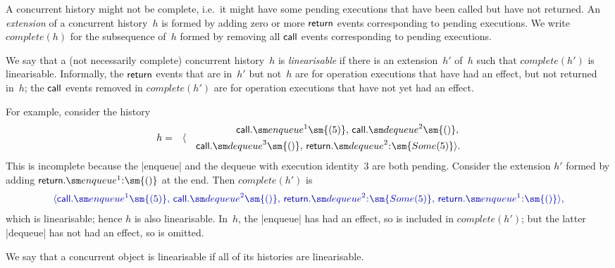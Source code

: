 A concurrent history might not be complete, i.e.~it might have some pending
executions that have been called but have not returned.  An \emph{extension}
of a concurrent history~$h$ is formed by adding zero or more $\mathsf{return}$ events
corresponding to pending executions.  We write $complete(h)$ for the
subsequence of~$h$ formed by removing all $\mathsf{call}$ events corresponding to
pending executions.

We say that a (not necessarily complete) concurrent history~$h$ is
\emph{linearisable} if there is an extension~$h'$ of~$h$ such that
$complete(h')$ is linearisable.  Informally, the $\mathsf{return}$ events that are
in~$h'$ but not~$h$ are for operation executions that have had an effect, but
not returned in~$h$; the $\mathsf{call}$ events removed in $complete(h')$ are for
operation executions that have not yet had an effect.

For example, consider the history
\begin{eqnarray*}
h & = & \langle
  \begin{align} 
  \call.\enqueue^1\sm{(5)},\, \call.\dequeue^2\sm{()},\, \\
  \quad  \call.\dequeue^3\sm{()},\,  \return.\dequeue^2\::\sm{Some(5)} \rangle.
  \end{align}
\end{eqnarray*}
This is incomplete because the |enqueue| and the dequeue with execution
identity~$3$ are both pending.  Consider the extension $h'$ formed by adding
$\return.\enqueue^1\::\sm{()}$ at the end.  Then $complete(h')$ is
\[\mstyle
\langle 
  \call.\enqueue^1\sm{(5)},\, \call.\dequeue^2\sm{()},\,
  \return.\dequeue^2\::\sm{Some(5)},\, \return.\enqueue^1\::\sm{()}\rangle,
\]
which is linearisable; hence $h$ is also linearisable.  In~$h$, the |enqueue|
has had an effect, so is included in $complete(h')$; but the latter |dequeue|
has not had an effect, so is omitted.

We say that a concurrent object is linearisable if all of its histories are
linearisable.


